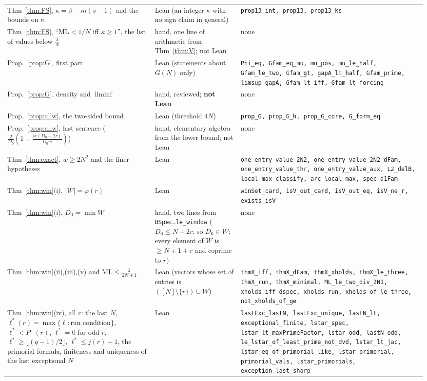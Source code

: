 \documentclass[11pt]{article}
\theoremstyle{definition}
\theoremstyle{remark}
\newcommand{\ML}{\mathrm{ML}}
\begin{document}
{\begin{longtable}{@{}p{}p{}p{}@{}}
Thm~\ref{thm:FS}, $\kappa=\beta-m(s-1)$ and the bounds on $\kappa$ & Lean (an integer $\kappa$ with no sign claim in general) & \texttt{prop13\_int, prop13, prop13\_ks} \\
Thm~\ref{thm:FS}, ``$\ML<1/N$ iff $\kappa\ge1$'', the list of values below $\frac1N$ & hand, one line of arithmetic from Thm~\ref{thm:V}; not Lean & none \\
Prop.~\ref{prop:G}, first part & Lean (statements about $G(N)$ only) & \texttt{Phi\_eq, Gfam\_eq\_mu, mu\_pos, mu\_le\_half, Gfam\_le\_two, Gfam\_gt, gapA\_lt\_half, Gfam\_prime, limsup\_gapA, Gfam\_lt\_iff, Gfam\_lt\_forcing} \\
Prop.~\ref{prop:G}, density and $\liminf$ & hand, reviewed; \textbf{not Lean} & none \\
Prop.~\ref{prop:allw}, the two-sided bound & Lean (threshold $4N$) & \texttt{prop\_G, prop\_G\_h, prop\_G\_core, G\_form\_eq} \\
Prop.~\ref{prop:allw}, last sentence ($\frac2{D_0}(1-\frac{4r(D_0-2r)}{D_0w})$) & hand, elementary algebra from the lower bound; not Lean & none \\
Thm~\ref{thm:exact}, $w\ge2N^2$ and the finer hypotheses & Lean & \texttt{one\_entry\_value\_2N2, one\_entry\_value\_2N2\_dFam, one\_entry\_value\_thr, one\_entry\_value\_aux, L2\_delB, local\_max\_classify, arc\_local\_max, spec\_d1Fam} \\
Thm~\ref{thm:win}(i), $|W|=\varphi(r)$ & Lean & \texttt{winSet\_card, isV\_out\_card, isV\_out\_eq, isV\_ne\_r, exists\_isV} \\
Thm~\ref{thm:win}(i), $D_0=\min W$ & hand, two lines from \texttt{DSpec.le\_window} ($D_0\le N+2r$, so $D_0\in W$; every element of $W$ is $\ge N+1+r$ and coprime to $r$) & none \\
Thm~\ref{thm:win}(ii),(iii),(v) and $\ML\le\frac2{2N+1}$ & Lean (vectors whose set of entries is $([N]\setminus\{r\})\cup W$) & \texttt{thmX\_iff, thmX\_dFam, thmX\_xholds, thmX\_le\_three, thmX\_run, thmX\_minimal, ML\_le\_two\_div\_2N1, xholds\_iff\_dspec, xholds\_run, xholds\_of\_le\_three, not\_xholds\_of\_ge} \\
Thm~\ref{thm:win}(iv), all $r$: the last $N$, $\ell^*(r)=\max\{\ell:\text{run condition}\}$, $\ell^*<P^+(r)$, $\ell^*=0$ for odd $r$, $\ell^*\ge\lfloor(q-1)/2\rfloor$, $\ell^*\le j(r)-1$, the primorial formula, finiteness and uniqueness of the last exceptional $N$ & Lean & \texttt{lastExc\_lastN, lastExc\_unique, lastN\_lt, exceptional\_finite, lstar\_spec, lstar\_lt\_maxPrimeFactor, lstar\_odd, lastN\_odd, le\_lstar\_of\_least\_prime\_not\_dvd, lstar\_lt\_jac, lstar\_eq\_of\_primorial\_like, lstar\_primorial, primorial\_vals, lstar\_primorials, exception\_last\_sharp} \\

\end{longtable}}
\end{document}
